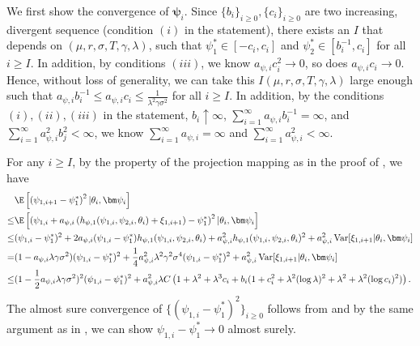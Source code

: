 We first show the convergence of $\bm\psi_i$. Since $\{b_i\}_{i\geq 0},\{c_i\}_{i\geq 0}$ are two increasing, divergent sequence (condition $(i)$ in the statement), there exists an $I$ that depends on $(\mu,r,\sigma,T,\gamma,\lambda)$, such that $\psi_1^* \in [-c_i,c_i]$ and $\psi_2^* \in [b_i^{-1}, c_i]$ for all $i\geq I$. In addition, by conditions $(iii)$, we know $a_{\psi,i}c_i^2\to 0$, so does $a_{\psi,i}c_i\to 0$. Hence, without loss of generality, we can take this $I(\mu,r,\sigma,T,\gamma,\lambda)$ large enough such that $a_{\psi,i}b_i^{-1} \leq a_{\psi,i}c_i \leq \frac{1}{\lambda^2\gamma\sigma^2} $ for all $i\geq I$. In addition, by the conditions $(i),(ii),(iii)$ in the statement, $b_i\uparrow \infty$, $\sum_{i=1}^{\infty}a_{\psi,i}b_i^{-1} = \infty$, and $\sum_{i=1}^{\infty}a_{\psi,i}^2 b_j^2 < \infty$, we know $\sum_{i=1}^{\infty}a_{\psi,i} = \infty$ and $\sum_{i=1}^{\infty}a_{\psi,i}^2 < \infty$. 

For any $i\geq I$, by the property of the projection mapping as in the proof of \citet[Theorem 2]{andradottir1995stochastic}, we have 
\[ \begin{aligned}
& \E\left[ \left( \psi_{1,i+1} - \psi_1^*\right)^2  | \theta_i,\bm\psi_i\right] \\
\leq &  \E\left[ \left(\psi_{1,i} + a_{\psi,i} \left( h_{\psi,1}(\psi_{1,i},\psi_{2,i},\theta_i) + \xi_{1,i+1} \right) - \psi_1^* \right)^2  | \theta_i,\bm\psi_i\right] \\
\leq & (\psi_{1,i} - \psi_1^*)^2 + 2a_{\psi,i}(\psi_{1,i} - \psi_1^*)h_{\psi,1}(\psi_{1,i},\psi_{2,i},\theta_i)  + a_{\psi,i}^2  h_{\psi,1}(\psi_{1,i},\psi_{2,i},\theta_i)^2 + a_{\psi,i}^2 \operatorname{Var}[\xi_{1,i+1}|\theta_i,\bm\psi_i] \\
= & (1 - a_{\psi,i}\lambda\gamma\sigma^2 ) (\psi_{1,i} - \psi_1^*)^2 + \frac{1}{4}a_{\psi,i}^2\lambda^2\gamma^2\sigma^4(\psi_{1,i} - \psi_1^*)^2 +  a_{\psi,i}^2 \operatorname{Var}[\xi_{1,i+1}|\theta_i,\bm\psi_i]\\
\leq & (1 - \frac{1}{2}a_{\psi,i}\lambda\gamma\sigma^2 )^2 (\psi_{1,i} - \psi_1^*)^2 + a_{\psi,i}^2\lambda C \left( 1 + \lambda^2 + \lambda^3 c_i + b_i(1 + c_i^2 + \lambda^2(\log\lambda)^2 + \lambda^2 + \lambda^2 (\log c_i)^2)  \right) .
\end{aligned}\]
The almost sure convergence of $\{ (\psi_{1,i} - \psi_1^*)^2\}_{i\geq 0}$ follows from \citet[Theorem 1]{robbins1971convergence} and by the same argument as in \citet[Theorem 2]{andradottir1995stochastic}, we can show $\psi_{1,i} - \psi_1^* \to 0$ almost surely.


